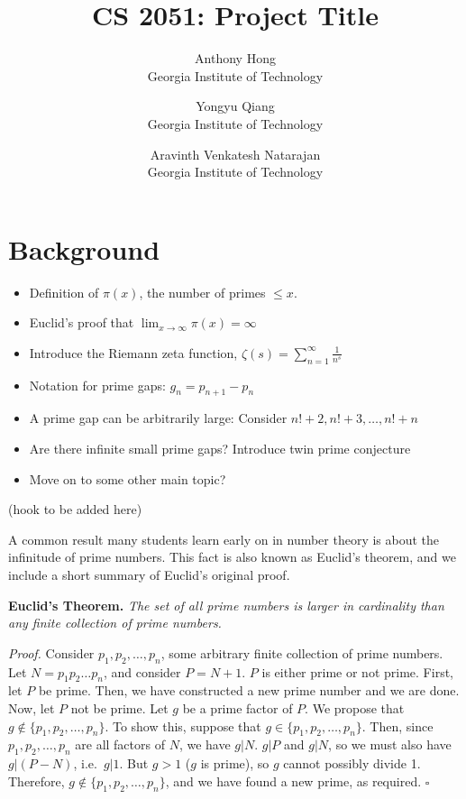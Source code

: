 \documentclass[12pt, letterpaper]{article}
\title{CS 2051: Project Title}
\author{Anthony Hong \\ Georgia Institute of Technology
\and Yongyu Qiang \\ Georgia Institute of Technology
\and Aravinth Venkatesh Natarajan \\ Georgia Institute of Technology}
\date{}
\begin{document}
\maketitle

\section{Background}
\begin{itemize}
  \item Definition of $\pi(x)$, the number of primes $\le x$.
  \item Euclid's proof that $\lim_{x \to \infty}\pi(x) = \infty$
  \item Introduce the Riemann zeta function, $\zeta(s) = \sum_{n = 1}^{\infty}\frac{1}{n^s}$
  \item Notation for prime gaps: $g_n = p_{n + 1} - p_n$
  \item A prime gap can be arbitrarily large: Consider $n! + 2, n! + 3, \dots, n! + n$
  \item Are there infinite small prime gaps? Introduce twin prime conjecture
  \item Move on to some other main topic?
\end{itemize}

(hook to be added here)

A common result many students learn early on in number theory is about the
infinitude of prime numbers. This fact is also known as Euclid's theorem,
and we include a short summary of Euclid's original proof.

\noindent
\textbf{Euclid's Theorem.} \textit{The set of all prime numbers is larger
in cardinality than any finite collection of prime numbers.}

\noindent
\textit{Proof.} Consider $p_1, p_2, \dots, p_n$, some arbitrary finite
collection of
prime numbers. Let $N = p_1p_2 \dots p_n$, and consider $P = N + 1$. $P$ is
either prime or not prime.
\newline\indent
First, let $P$ be prime. Then, we have constructed a new prime number and
we are done.
\newline\indent
Now, let $P$ not be prime. Let $g$ be a prime factor of $P$. We propose that
$g \notin \{p_1, p_2, \dots, p_n\}$. To show this, suppose that
$g \in \{p_1, p_2, \dots, p_n\}$. Then, since $p_1, p_2, \dots, p_n$ are all
factors of $N$, we have $g | N$. $g | P$ and $g | N$, so
we must also have $g | (P - N)$, i.e.\ $g | 1$. But $g > 1$ ($g$ is prime),
so $g$ cannot possibly divide 1. Therefore,
$g \notin \{p_1, p_2, \dots, p_n\}$, and we have found a new prime, as
required. \hfill$\square$
\end{document}
